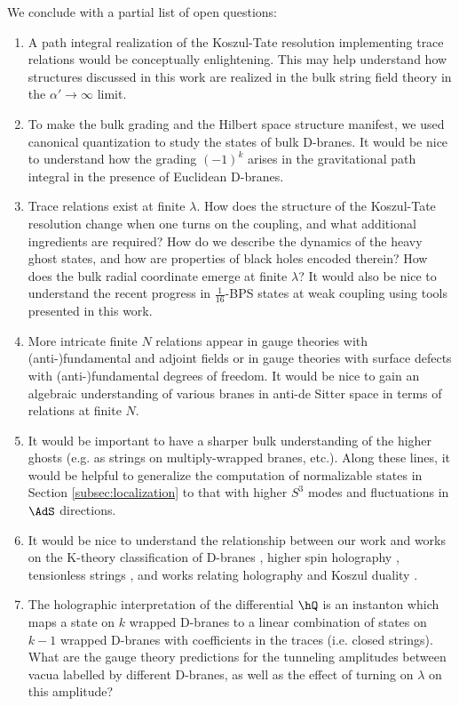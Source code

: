 \documentclass[a4paper,12pt]{article}
\begin{document}
We conclude with a partial list of open questions:
\begin{enumerate}
    \item A path integral realization of the Koszul-Tate resolution implementing trace relations would be conceptually enlightening. This may help understand how structures discussed in this work are realized in the bulk string field theory in the $\alpha' \to \infty$ limit.
    \item To make the bulk grading and the Hilbert space structure manifest, we used canonical quantization to study the states of bulk D-branes. It would be nice to understand how the grading $(-1)^k$ arises in the gravitational path integral in the presence of Euclidean D-branes.
    \item Trace relations exist at finite $\lambda$. How does the structure of the Koszul-Tate resolution change when one turns on the coupling, and what additional ingredients are required? How do we describe the dynamics of the heavy ghost states, and how are properties of black holes encoded therein? How does the bulk radial coordinate emerge at finite $\lambda$? It would also be nice to understand the recent progress in $\frac{1}{16}$-BPS states at weak coupling \cite{Chang:2022mjp,Choi:2022caq,Choi:2023znd,Budzik:2023vtr,Chang:2023zqk} using tools presented in this work.
    \item More intricate finite $N$ relations appear in gauge theories with (anti-)fundamental and adjoint fields or in gauge theories with surface defects with (anti-)fundamental degrees of freedom. It would be nice to gain an algebraic understanding of various branes in anti-de Sitter space in terms of relations at finite $N$.
    \item It would be important to have a sharper bulk understanding of the higher ghosts (e.g. as strings on multiply-wrapped branes, etc.). Along these lines, it would be helpful to generalize the computation of normalizable states in Section \ref{subsec:localization} to that with higher $S^3$ modes and fluctuations in $\AdS$ directions.
    \item It would be nice to understand the relationship between our work and works on the K-theory classification of D-branes \cite{Green:1996dd,Minasian:1997mm,Witten:1998cd,Freed:2000tt,Maldacena:2001xj,Witten:2000cn}, higher spin holography \cite{Klebanov:2002ja,Sezgin:2002rt,Giombi:2009wh,Gaberdiel:2010pz}, tensionless strings \cite{Gaberdiel:2018rqv,Eberhardt:2018ouy,Eberhardt:2019ywk,Gaberdiel:2021jrv}, and works relating holography and Koszul duality \cite{Costello:2016mgj,Costello:2017fbo,Ishtiaque:2018str,Costello:2018zrm,Costello:2020jbh}.
    \item  The holographic interpretation of the differential $\hQ$ is an instanton which maps a state on $k$ wrapped D-branes to a linear combination of states on $k-1$ wrapped D-branes with coefficients in the traces (i.e. closed strings). What are the gauge theory predictions for the tunneling amplitudes between vacua labelled by different D-branes, as well as the effect of turning on $\lambda$ on this amplitude?
\end{enumerate}
\end{document}
